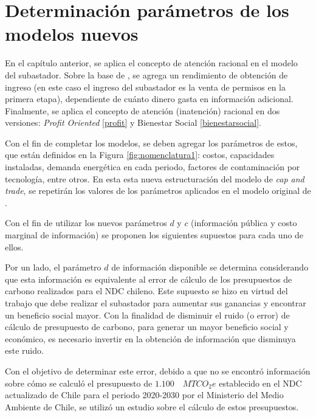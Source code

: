 \section{Determinación parámetros de los modelos nuevos}\label{introresultados}

En el capítulo anterior, se aplica el concepto de atención racional en el modelo del subastador. Sobre la base de , se agrega un rendimiento de obtención de ingreso (en este caso el ingreso del subastador es la venta de permisos en la primera etapa), dependiente de cuánto dinero gasta en información adicional. Finalmente, se aplica el concepto de atención (inatención) racional en dos versiones: \textit{Profit Oriented} \ref{profit} y Bienestar Social \ref{bienestarsocial}. 
\vspace{2.5mm}

Con el fin de completar los modelos, se deben agregar los parámetros de estos, que están definidos en la Figura \ref{fig:nomenclatura1}: costos, capacidades instaladas, demanda energética en cada periodo, factores de contaminación por tecnología, entre otros. En esta esta nueva estructuración del modelo de \textit{cap and trade}, se repetirán los valores de los parámetros aplicados en el modelo original de .
\vspace{2.5mm}

Con el fin de utilizar los nuevos parámetros $d$ y $c$ (información pública y costo marginal de información) se proponen los siguientes supuestos para cada uno de ellos.
\vspace{2.5mm}

Por un lado, el parámetro $d$ de información disponible se determina considerando que esta información es equivalente al error de cálculo de los presupuestos de carbono realizados para el NDC chileno. Este supuesto se hizo en virtud del trabajo que debe realizar el subastador para aumentar sus ganancias y encontrar un beneficio social mayor. Con la finalidad de disminuir el ruido (o error) de cálculo de presupuesto de carbono, para generar un mayor beneficio social y económico, es necesario invertir en la obtención de información que disminuya este ruido. \vspace{2.5mm}

Con el objetivo de determinar este error, debido a que no se encontró información sobre cómo se calculó el presupuesto de $1.100\quad MTCO_{2}e$ establecido en el NDC actualizado de Chile para el periodo 2020-2030 por el Ministerio del Medio Ambiente de Chile, se utilizó un estudio sobre el cálculo de estos presupuestos.
\vspace{2.5mm}

